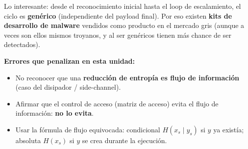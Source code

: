 \documentclass[../main.tex]{subfiles}
\begin{document}
Lo interesante: desde el reconocimiento inicial hasta el loop de escalamiento, el
ciclo es \textbf{genérico} (independiente del payload final). Por eso existen
\textbf{kits de desarrollo de malware} vendidos como producto en el mercado gris
(aunque a veces son ellos mismos troyanos, y al ser genéricos tienen más chance de
ser detectados).

\begin{ojo}
\textbf{Errores que penalizan en esta unidad:}
\begin{itemize}[noitemsep]
  \item No reconocer que una \textbf{reducción de entropía es flujo de información}
        (caso del disipador / side-channel).
  \item Afirmar que el control de acceso (matriz de acceso) evita el flujo de
        información: \textbf{no lo evita}.
  \item Usar la fórmula de flujo equivocada: condicional $H(x_s\mid y_s)$ si $y$ ya
        existía; absoluta $H(x_s)$ si $y$ se crea durante la ejecución.
\end{itemize}
\end{ojo}
\end{document}
